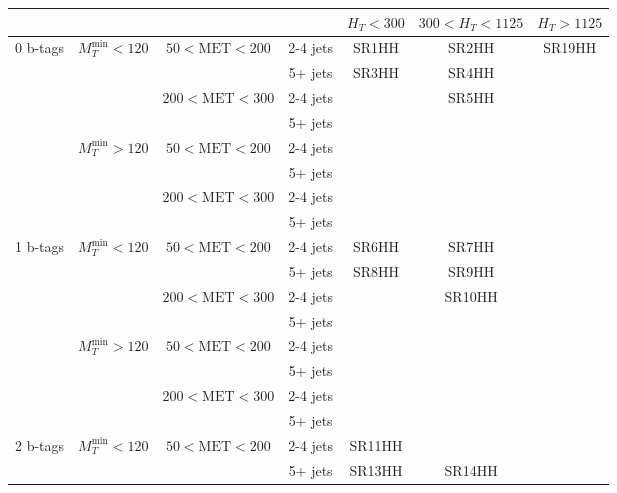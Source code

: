 \documentclass[plain,landscape]{article}
\begin{document}
\begin{table}
\renewcommand{\arraystretch}{1.3}
\centering
\begin{tabular}{|c|c|c|c|c|c|c|}
\hline
& & \multicolumn{2}{|c|}{ } & $H_T < 300$ & $300 < H_T < 1125$ & $H_T > 1125$  \\
\hline
\multirow{8}{*}{0 b-tags} &  \multirow{4}{*}{$M_T^{\textrm{min}} < 120$} & \multirow{2}{*}{ $50 < \textrm{MET} < 200$} & 2-4 jets & SR1HH & SR2HH & \multirow{30}{*}{SR19HH}\\
\cline{4-6}
& & & 5+ jets & \multirow{7}{*}{SR3HH} & SR4HH & \\
\cline{3-4} \cline{6-6}
& &  \multirow{2}{*}{$200 < \textrm{MET} < 300$} &  2-4 jets & &  \multirow{6}{*}{SR5HH} & \\
\cline{4-4} 
& & & 5+ jets & & &  \\
\cline{2-4}
& \multirow{4}{*}{$M_T^{\textrm{min}} > 120$} & \multirow{2}{*}{ $50 < \textrm{MET} < 200$} & 2-4 jets & & & \\
\cline{4-4}
& & & 5+ jets & & & \\
\cline{3-4}
& &  \multirow{2}{*}{$200 < \textrm{MET} < 300$} &  2-4 jets & & &  \\
\cline{4-4} 
& & & 5+ jets & & &  \\
\cline{1-6}
\multirow{8}{*}{1 b-tags} & \multirow{4}{*}{$M_T^{\textrm{min}} < 120$} & \multirow{2}{*}{ $50 < \textrm{MET} < 200$} & 2-4 jets & SR6HH & SR7HH & \\
\cline{4-6}
& & & 5+ jets & \multirow{7}{*}{SR8HH} & SR9HH & \\
\cline{3-4} \cline{6-6}
& & \multirow{2}{*}{ $200 < \textrm{MET} < 300$} &  2-4 jets & & \multirow{7}{*}{SR10HH} & \\
\cline{4-4} 
& & & 5+ jets & & & \\
\cline{2-4} 
 & \multirow{4}{*}{$M_T^{\textrm{min}} > 120$} & \multirow{2}{*}{ $50 < \textrm{MET} < 200$} & 2-4 jets & & & \\
\cline{4-4} 
& & & 5+ jets &  &  & \\
\cline{3-4}
& & \multirow{2}{*}{ $200 < \textrm{MET} < 300$} &  2-4 jets & & & \\
\cline{4-4}
& & & 5+ jets & & & \\
\cline{1-6}
\multirow{8}{*}{2 b-tags} & \multirow{4}{*}{$M_T^{\textrm{min}} < 120$} & \multirow{2}{*}{ $50 < \textrm{MET} < 200$} & 2-4 jets & SR11HH & SR12HH & \\
\cline{4-6}
& & & 5+ jets & \multirow{7}{*}{SR13HH} & SR14HH &  \\

\end{tabular}
\end{table}
\end{document}
